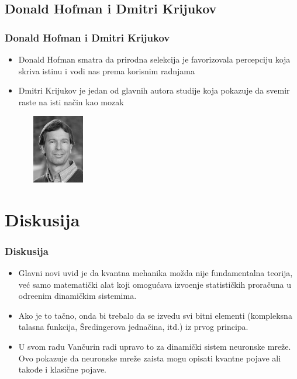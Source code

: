 \documentclass{beamer}
\begin{document}
 \subsection{Donald Hofman i Dmitri Krijukov}
    \begin{frame}[fragile]\frametitle{Donald Hofman i Dmitri Krijukov}
	   \begin{itemize}	
		  \item Donald Hofman smatra da prirodna selekcija je favorizovala percepciju koja skriva istinu i vodi nas prema korisnim radnjama
		  \item Dmitri Krijukov je jedan od glavnih autora studije koja pokazuje da svemir raste na isti način kao mozak
	   \end{itemize}
          \begin{figure}[h]
           \centering
           \includegraphics[width=27mm,height=30mm, scale=0.5] 
             {hoffman.jpg}
          \label{fig:hoffman.jpg}
          \end{figure}
    \end{frame}


\section{Diskusija}
    \begin{frame}[fragile]\frametitle{Diskusija}
	   \begin{itemize}	
            \item Glavni novi uvid je da kvantna mehanika možda nije fundamentalna teorija, već samo matematički alat koji omogućava izvo\dj enje statističkih proračuna u odre\dj enim dinamičkim sistemima.
		  \item Ako je to tačno, onda bi trebalo da se izvedu svi bitni elementi (kompleksna talasna funkcija, Šredingerova jednačina, itd.) iz prvog principa.
		  \item U svom radu Vančurin radi upravo to za dinamički sistem neuronske mreže. Ovo pokazuje da neuronske mreže zaista mogu opisati kvantne pojave ali takođe i klasične pojave.
	   \end{itemize}
    \end{frame}
\end{document}
